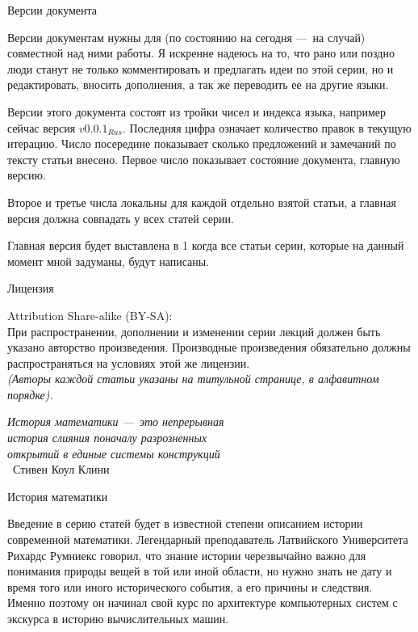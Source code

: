 \documentclass[math.tex]{subfiles}
\begin{document}
	\vspace{1cm}
	\LARGE{Версии документа}\\
	\normalsize
	
	Версии документам нужны для (по состоянию на сегодня —\ на случай) со\-вместной над ними работы.
Я искренне надеюсь на то, что рано или поздно люди станут не только комментировать и предлагать идеи по этой серии, но и редак\-тировать, вносить дополнения, а так же переводить ее на другие языки.
	
	Версии этого документа состоят из тройки чисел и индекса языка, например сейчас версия $v0.0.1_{Rus}$. 
Последняя цифра означает количество правок в текущую итерацию. 
Число посередине показывает сколько предложений и замечаний по тексту статьи внесено. 
Первое число показывает состояние документа, главную версию.

	Второе и третье числа локальны для каждой отдельно взятой статьи, а главная версия должна совпадать у всех статей серии.

	Главная версия будет выставлена в 1 когда все статьи серии, которые на данный момент мной задуманы, будут написаны.
	
	\vspace{1cm}
	\LARGE{Лицензия}\\
	\normalsize

	Attribution Share-alike (BY-SA):\\

	При распространении, дополнении и изменении серии лекций должен быть указано авторство про\-из\-ведения.
Производные произведения обязательно должны распространяться на условиях этой же лицензии.\\
	
	\emph{(Авторы каждой статьи указаны на титульной странице, в алфавитном порядке).}
	
	\vspace{1cm}
	\newpage
	\begin{flushright}
		\emph{История математики —\ это непрерывная\\ история слияния поначалу разрозненных\\ открытий в единые системы конструкций}\\
		~Стивен Коул Клини
	\end{flushright}
	\LARGE{История математики}
	\newline
	\normalsize
	
	Введение в серию статей будет в известной степени описанием истории сов\-ременной математики.
Легендарный преподаватель Латвийского Университета Рихардс Румниекс говорил, что знание истории черезвычайно важно для пони\-мания природы вещей в той или иной области, но нужно знать не дату и время того или иного исторического события, а его причины и следствия.
Именно поэтому он начинал свой курс по архитектуре компьютерных систем с экскурса в историю вычислительных машин.
\end{document}
